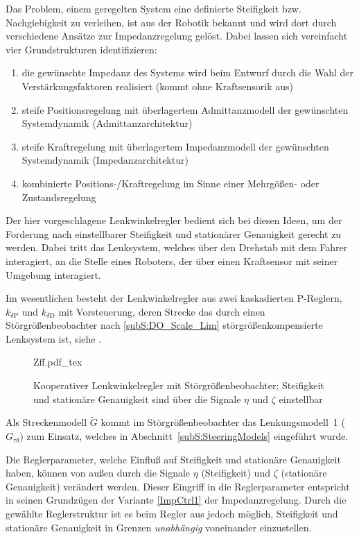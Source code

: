Das Problem, einem geregelten System eine definierte Steifigkeit bzw. Nachgiebigkeit zu verleihen, ist aus der Robotik bekannt und wird dort durch verschiedene Ansätze zur Impedanzregelung gelöst. Dabei lassen sich vereinfacht vier Grundstrukturen identifizieren:
\begin{enumerate}
\item die gewünschte Impedanz des Systems wird beim Entwurf durch die Wahl der Verstärkungsfaktoren realisiert (kommt ohne Kraftsensorik aus)\label{ImpCtrl1}
\item steife Positionsregelung mit überlagertem Admittanzmodell der gewünschten Systemdynamik (Admittanzarchitektur)
\item steife Kraftregelung mit überlagertem Impedanzmodell der gewünschten Systemdynamik (Impedanzarchitektur)
\item kombinierte Positions-/Kraftregelung im Sinne einer Mehrgößen- oder Zustandsregelung
\end{enumerate}

Der hier vorgeschlagene Lenkwinkelregler bedient sich bei diesen Ideen, um der Forderung nach einstellbarer Steifigkeit und stationärer Genauigkeit gerecht zu werden. Dabei tritt das Lenksystem, welches über den Drehstab mit dem Fahrer interagiert, an die Stelle eines Roboters, der über einen Kraftsensor mit seiner Umgebung interagiert.

Im wesentlichen besteht der Lenkwinkelregler aus zwei kaskadierten P-Reglern, $k_{\delta\mathrm{P}}$ und $k_{\delta\mathrm{D}}$ mit Vorsteuerung, deren Strecke das durch einen Störgrößenbeobachter nach \ref{subS:DO_Scale_Lim} störgrößenkompensierte Lenksystem ist, siehe .


\begin{figure}[htp!]
\centering
{Zff.pdf_tex}
\caption{Kooperativer Lenkwinkelregler mit Störgrößenbeobachter; Steifigkeit und stationäre Genauigkeit sind über die Signale $\eta$ und $\zeta$ einstellbar}
\label{fig:Zff}
\end{figure}


Als Streckenmodell $\tilde G$ kommt im Störgrößenbeobachter das Lenkungsmodell~1 ($G_{\tau\delta}$) zum Einsatz, welches in Abschnitt~\ref{subS:SteeringModels} eingeführt wurde.

Die Reglerparameter, welche Einfluß auf Steifigkeit und stationäre Genauigkeit haben, können von außen durch die Signale $\eta$ (Steifigkeit) und $\zeta$ (stationäre Genauigkeit) verändert werden.
Dieser Eingriff in die Reglerparameter entspricht in seinen Grundzügen der Variante \ref{ImpCtrl1} der Impedanzregelung. Durch die gewählte Reglerstruktur ist es beim Regler aus  jedoch möglich, Steifigkeit und stationäre Genauigkeit in Grenzen \emph{unabhängig} voneinander einzustellen.

